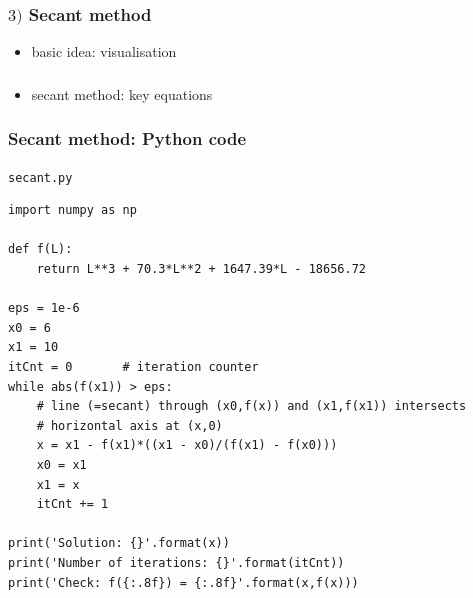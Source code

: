 \documentclass[english,14pt]{beamer}
\begin{document}

\begin{frame}[fragile]

\frametitle{$3)$ Secant method}

\begin{itemize}
	\item basic idea: visualisation
\end{itemize}

\end{frame}


\begin{frame}[fragile]

\frametitle{}

\begin{itemize}
	\item secant method: key equations
\end{itemize}

\end{frame}

%
%
%
%


\begin{frame}[fragile]

\frametitle{Secant method: Python code}

\texttt{secant.py}
\begin{lstlisting}[style=CStyle,basicstyle=\scriptsize]
import numpy as np

def f(L):
    return L**3 + 70.3*L**2 + 1647.39*L - 18656.72

eps = 1e-6
x0 = 6
x1 = 10
itCnt = 0       # iteration counter
while abs(f(x1)) > eps:
    # line (=secant) through (x0,f(x)) and (x1,f(x1)) intersects
    # horizontal axis at (x,0)
    x = x1 - f(x1)*((x1 - x0)/(f(x1) - f(x0)))
    x0 = x1
    x1 = x
    itCnt += 1

print('Solution: {}'.format(x))
print('Number of iterations: {}'.format(itCnt))
print('Check: f({:.8f}) = {:.8f}'.format(x,f(x)))
\end{lstlisting}

\end{frame}
\end{document}
